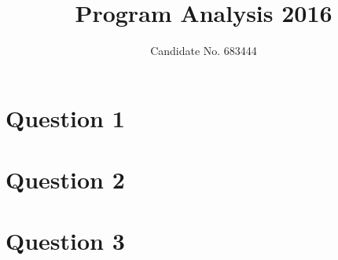 \documentclass{tufte-handout}
\title{Program Analysis 2016}
\author{Candidate No. 683444}
\theoremstyle{definition}
\numberwithin{definition}{section}
\theoremstyle{plain}
\numberwithin{prop}{section}
\theoremstyle{plain}
\numberwithin{lemma}{section}
\theoremstyle{plain}
\numberwithin{corollary}{section}
\begin{document}
\maketitle

\section{Question 1}\label{sec:q-1}


\newcommand{\sectionbreak}{\clearpage}

\section{Question 2}\label{sec:q-2}


\section{Question 3}\label{sec:q-3}

\end{document}
